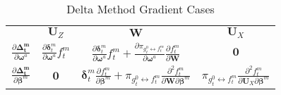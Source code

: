 \documentclass[12pt]{article}
\newcommand{\gateprod}[2]{\pi_{#1 \longleftrightarrow #2}}
\begin{document}
\begin{table}
  \begin{center}
    \begin{tabular}{| l | c c c |}
    \hline
                                                                                    & \underline{$\boldsymbol{U}_{Z}$}                                                            & \underline{$\boldsymbol{W}$}                                                                                                                                                                                           & \underline{$\boldsymbol{U}_{X}$}   \\ [2ex]
    $\frac{\partial \boldsymbol{\Delta_{t}^{m}}}{\partial \boldsymbol{\omega}^{a}}$ & $\frac{\partial \boldsymbol{\delta}^{m}_{t}}{\partial \boldsymbol{\omega}^{a}} f^{m}_{t}$   & $\frac{\partial \boldsymbol{\delta}^{m}_{t}}{\partial \boldsymbol{\omega}^{a}} f^{m}_{t} + \frac{\partial \gateprod{g^{0}_{t}}{f^{m}_{t}}}{\partial \boldsymbol{\omega}^{a}}  \frac{\partial f^{m}_{t}}{{\partial \boldsymbol{W}}}$                                           & $\boldsymbol{0}$                   \\ [2ex]
    $\frac{\partial \boldsymbol{\Delta_{t}^{m}}}{\partial \boldsymbol{\beta}^{m}}$  & $\boldsymbol{0}$                                                                            & $\boldsymbol{\delta}^{m}_{t} \frac{\partial f^{m}_{t}}{\partial \boldsymbol{\beta}^{m}} + \gateprod{g^{0}_{t}}{f^{m}_{t}}   \frac{\partial^{2} f^{m}_{t}}{\partial \boldsymbol{W} \partial \boldsymbol{\beta}^{m}}$    & $\gateprod{g^{0}_{t}}{f^{m}_{t}}  \frac{\partial^{2} f^{m}_{t}}{\partial \boldsymbol{U}_{X} \partial \boldsymbol{\beta}^{m}}$  \\ [1ex]
    \hline
    \end{tabular}
  \caption{\label{tbl:delta_method_gradients} Delta Method Gradient Cases}
  \end{center}
\end{table}
\end{document}
